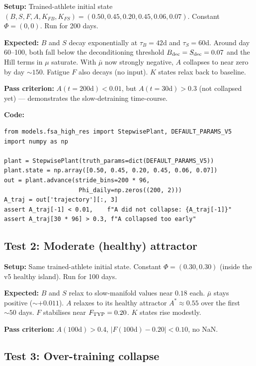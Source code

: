 \documentclass[11pt,a4paper]{article}
\theoremstyle{definition}
\begin{document}
\textbf{Setup:} Trained-athlete initial state $(B, S, F, A, K_{FB},
K_{FS}) = (0.50, 0.45, 0.20, 0.45, 0.06, 0.07)$. Constant
$\Phi = (0, 0)$. Run for 200 days.

\textbf{Expected:} $B$ and $S$ decay exponentially at $\tau_B = 42$d
and $\tau_S = 60$d. Around day 60--100, both fall below the
deconditioning threshold $B_{\rm dec} = S_{\rm dec} = 0.07$ and the
Hill terms in $\mu$ saturate. With $\bar\mu$ now strongly negative,
$A$ collapses to near zero by day $\sim 150$. Fatigue $F$ also decays
(no input). $K$ states relax back to baseline.

\textbf{Pass criterion:} $A(t = 200\text{d}) < 0.01$, but $A(t =
30\text{d}) > 0.3$ (not collapsed yet) --- demonstrates the
slow-detraining time-course.

\textbf{Code:}
\begin{lstlisting}
from models.fsa_high_res import StepwisePlant, DEFAULT_PARAMS_V5
import numpy as np

plant = StepwisePlant(truth_params=dict(DEFAULT_PARAMS_V5))
plant.state = np.array([0.50, 0.45, 0.20, 0.45, 0.06, 0.07])
out = plant.advance(stride_bins=200 * 96,
                     Phi_daily=np.zeros((200, 2)))
A_traj = out['trajectory'][:, 3]
assert A_traj[-1] < 0.01,    f"A did not collapse: {A_traj[-1]}"
assert A_traj[30 * 96] > 0.3, f"A collapsed too early"
\end{lstlisting}

\subsection{Test 2: Moderate (healthy) attractor}

\textbf{Setup:} Same trained-athlete initial state. Constant
$\Phi = (0.30, 0.30)$ (inside the v5 healthy island). Run for 100 days.

\textbf{Expected:} $B$ and $S$ relax to slow-manifold values near
$0.18$ each. $\bar\mu$ stays positive ($\sim +0.011$). $A$ relaxes to
its healthy attractor $A^* \approx 0.55$ over the first $\sim 50$ days.
$F$ stabilises near $F_{\rm TYP} = 0.20$. $K$ states rise modestly.

\textbf{Pass criterion:} $A(100\text{d}) > 0.4$, $|F(100\text{d}) - 0.20| < 0.10$, no
NaN.

\subsection{Test 3: Over-training collapse}
\end{document}
